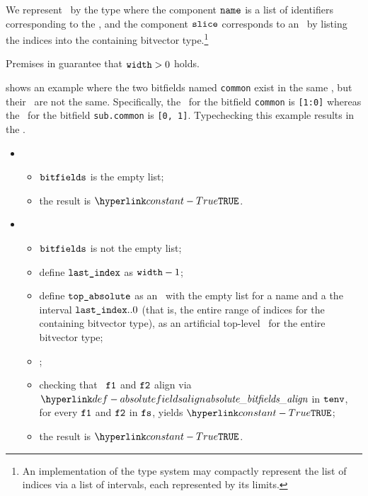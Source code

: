 We represent \absolutebitfields\ by the type
where the component $\texttt{name}$ is a list of identifiers corresponding to the \absolutename,
and the component $\texttt{slice}$ corresponds to an \absoluteslice\ by listing the indices
into the containing bitvector type.\footnote{An implementation of the type system may compactly represent the list of indices
via a list of intervals, each represented by its limits.}

Premises in  guarantee that $\texttt{width} > 0$ holds.

 shows an example where the two bitfields named \texttt{common}
exist in the same \bitfieldscope, but their \absoluteslices\ are not the same.
Specifically, the \absoluteslice\ for the bitfield \texttt{common} is \texttt{[1:0]}
whereas the \absoluteslice\ for the bitfield \texttt{sub.common} is \texttt{[0, 1]}.
Typechecking this example results in the \typingerrorterm{} \BadSlices.


\ProseParagraph
\OneApplies
\begin{itemize}
  \item {}
  \begin{itemize}
    \item $\vbitfields$ is the empty list;
    \item the result is $\True$.
  \end{itemize}

  \item {}
  \begin{itemize}
    \item $\vbitfields$ is not the empty list;
    \item define $\texttt{last\_index}$ as $\texttt{width} - 1$;
    \item define $\vtopabsolute$ as an \absolutebitfield\ with the empty list
          for a name and a the interval $\texttt{last\_index}..0$ (that is, the entire range
          of indices for the containing bitvector type),
          as an artificial top-level \absolutebitfield\ for the entire bitvector type;
    \item \Prosebitfieldstoabsolute{$\tenv$}{$\vbitfields$}{$\vtopabsolute$}{$\vfs$};
    \item checking that \absolutebitfields\ $\texttt{f1}$ and $\texttt{f2}$ align via
          $\absolutebitfieldsalign$ in $\tenv$, for every $\texttt{f1}$ and $\texttt{f2}$ in $\vfs$,
          yields $\True$\ProseTerminateAs{\BadSlices};
    \item the result is $\True$.
  \end{itemize}
\end{itemize}

